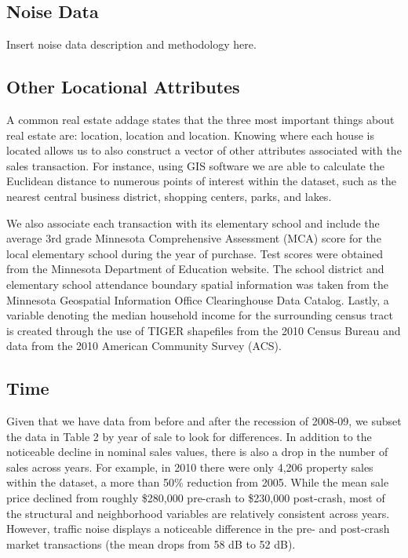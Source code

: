 \documentclass{article}\usepackage{graphicx, color}
\begin{document}
\subsection{Noise Data}
Insert noise data description and methodology here. 

\subsection{Other Locational Attributes}
A common real estate addage states that the three most important things about real estate are: location, location and location. Knowing where each house is located allows us to also construct a vector of other attributes associated with the sales transaction. For instance, using GIS software we are able to calculate the Euclidean distance to numerous points of interest within the dataset, such as the nearest central business district, shopping centers, parks, and lakes. 

We also associate each transaction with its elementary school and include the average 3rd grade Minnesota Comprehensive Assessment (MCA) score for the local elementary school during the year of purchase. Test scores were obtained from the Minnesota Department of Education website. The school district and elementary school attendance boundary spatial information was taken from the Minnesota Geospatial Information Office Clearinghouse Data Catalog. Lastly, a variable denoting the median household income for the surrounding census tract is created through the use of TIGER shapefiles from the 2010 Census Bureau and data from the 2010 American Community Survey (ACS). 

\subsection{Time}
Given that we have data from before and after the recession of 2008-09, we subset the data in Table 2 by year of sale to look for differences. In addition to the noticeable decline in nominal sales values, there is also a drop in the number of sales across years. For example, in 2010 there were only 4,206 property sales within the dataset, a more than 50\% reduction from 2005. While the mean sale price declined from roughly \$280,000 pre-crash to \$230,000 post-crash, most of the structural and neighborhood variables are relatively consistent across years. However, traffic noise displays a noticeable difference in the pre- and post-crash market transactions (the mean drops from 58 dB to 52 dB). 
\end{document}
